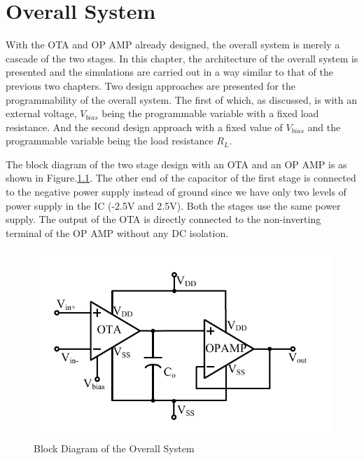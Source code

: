 \chapter{Overall System}
With the OTA and OP AMP already designed, the overall system is merely a cascade of the two stages. In this chapter, the architecture of the overall system is presented and the simulations are carried out in a way similar to that of the previous two chapters. Two design approaches are presented for the programmability of the overall system. The first of which, as discussed, is with an external voltage, $V_{bias}$ being the programmable variable with a fixed load resistance. And the second design approach with a fixed value of $V_{bias}$ and the programmable variable being the load resistance $R_L$.

The block diagram of the two stage design with an OTA and an OP AMP is as shown in Figure.\ref{fig:System_Block_Diagram}. The other end of the capacitor of the first stage is connected to the negative power supply instead of ground since we have only two levels of power supply in the IC (-2.5V and 2.5V). Both the stages use the same power supply. The output of the OTA is directly connected to the non-inverting terminal of the OP AMP without any DC isolation.

\begin{figure} [H]
\centering
\includegraphics[scale=1]{Figures/System_Level/System_Overview.pdf}
\caption{Block Diagram of the Overall System}
\label{fig:System_Block_Diagram}
\end{figure}

